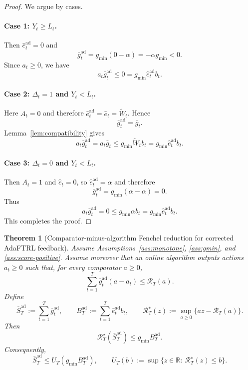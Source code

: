 \documentclass[11pt]{article}
\newtheorem{theorem}{Theorem}
\newcommand{\R}{\mathbb{R}}
\newcommand{\1}{\mathbf{1}}
\begin{document}
\begin{proof}
We argue by cases.

\paragraph{Case 1: $Y_t\ge L_t$.}
Then $\hat e_t^{\mathrm{ad}}=0$ and
\[
\bar g_t^{\mathrm{ad}}=g_{\min}(0-\alpha)=-\alpha g_{\min}<0.
\]
Since $a_t\ge 0$, we have
\[
a_t\bar g_t^{\mathrm{ad}}\le 0 = g_{\min}\hat e_t^{\mathrm{ad}} b_t.
\]

\paragraph{Case 2: $\Delta_t=1$ and $Y_t<L_t$.}
Here $A_t=0$ and therefore $\hat e_t^{\mathrm{ad}}=\hat e_t=\widetilde W_t$. Hence
\[
\bar g_t^{\mathrm{ad}}=\bar g_t.
\]
Lemma~\ref{lem:compatibility} gives
\[
a_t\bar g_t^{\mathrm{ad}}=a_t\bar g_t\le g_{\min}\widetilde W_t b_t=g_{\min}\hat e_t^{\mathrm{ad}} b_t.
\]

\paragraph{Case 3: $\Delta_t=0$ and $Y_t<L_t$.}
Then $A_t=1$ and $\hat e_t=0$, so $\hat e_t^{\mathrm{ad}}=\alpha$ and therefore
\[
\bar g_t^{\mathrm{ad}}=g_{\min}(\alpha-\alpha)=0.
\]
Thus
\[
a_t\bar g_t^{\mathrm{ad}}=0\le g_{\min}\alpha b_t=g_{\min}\hat e_t^{\mathrm{ad}} b_t.
\]
This completes the proof.
\end{proof}

\begin{theorem}[Comparator-minus-algorithm Fenchel reduction for corrected AdaFTRL feedback]
\label{thm:app-blackbox-variant}
Assume Assumptions~\ref{ass:monotone}, \ref{ass:gmin}, and \ref{ass:score-positive}. Assume moreover that an online algorithm outputs actions \(a_t\ge 0\) such that, for every comparator \(a\ge 0\),
\[
\sum_{t=1}^T \bar g_t^{\mathrm{ad}}(a-a_t)\le \mathcal R_T(a).
\]
Define
\[
\bar S_T^{\mathrm{ad}}:=\sum_{t=1}^T \bar g_t^{\mathrm{ad}},
\qquad
B_T^{\mathrm{ad}}:=\sum_{t=1}^T \hat e_t^{\mathrm{ad}} b_t,
\qquad
\mathcal R_T^\star(z):=\sup_{a\ge 0}\{az-\mathcal R_T(a)\}.
\]
Then
\[
\mathcal R_T^\star(\bar S_T^{\mathrm{ad}})\le g_{\min}B_T^{\mathrm{ad}}.
\]
Consequently,
\[
\bar S_T^{\mathrm{ad}}\le U_T(g_{\min}B_T^{\mathrm{ad}}),
\qquad
U_T(b):=\sup\{z\in\R:\ \mathcal R_T^\star(z)\le b\}.
\]
\end{theorem}
\end{document}
